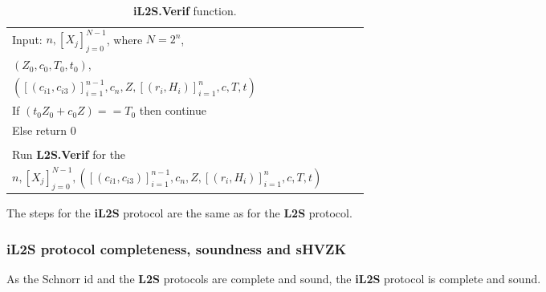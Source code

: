 \documentclass{mathcryptology} %
\theoremstyle{title}
\theoremstyle{titleof}
\begin{document}
    \begin{table}[!htb]\centering
        \caption{\textbf{iL2S.Verif} function.}\label{Tab:8}
        \begin{tabular}{|>{\raggedright\arraybackslash}p{0.9\linewidth}|}
            \hline
            Input: $n, {\left[X_{j}\right]}_{j=0}^{N-1}$, where $N=2^{n}$,\\
            $\left({Z}_{0},c_{0},T_{0},t_{0}\right)$,\\
            $\left({\left[\left(c_{i1}, c_{i3}\right)\right]}_{i=1}^{n-1},
            c_{n}, Z, {\left[\left(r_{i}, H_{i}\right)\right]}_{i=1}^n,c, T, t\right)$\\
            \hline
            If $\left(t_{0} Z_{0} + c_{0}Z \right)==T_{0}$ then continue\\
            Else return $0$\\
            \\
            Run \textbf{L2S.Verif} for the\\
            $n,{\left[X_{j}\right]}_{j=0}^{N-1},
            \left(
                {\left[\left(c_{i1}, c_{i3}\right)\right]}_{i=1}^{n-1},
                c_{n}, Z,
                {\left[\left(r_{i}, H_{i}\right)\right]}_{i=1}^n, c, T, t\right)$\\
            \hline
        \end{tabular}
    \end{table}

    The steps for the \textbf{iL2S} protocol are the same as for the \textbf{L2S} protocol.

\subsubsection{iL2S protocol completeness, soundness and sHVZK}\label{Sec:7.1.1.}
    As the Schnorr id and the \textbf{L2S} protocols are complete and sound, the \textbf{iL2S} protocol is complete and sound.
    
\end{document}
